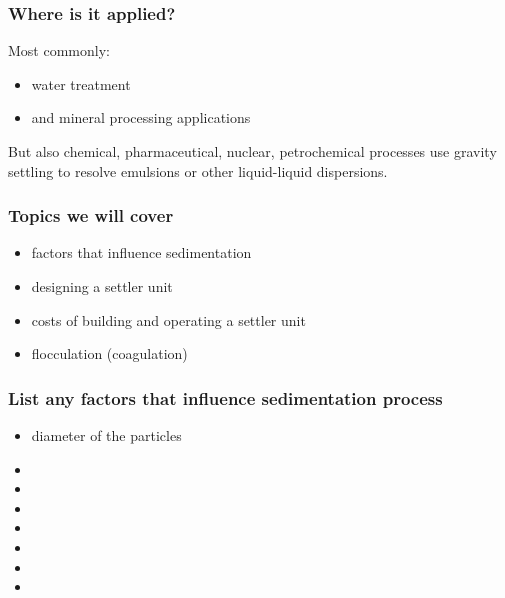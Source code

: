 \begin{frame}\frametitle{Where is it applied?}	
	Most commonly:
	\begin{itemize}
		\item	water treatment
		\item	and mineral processing applications
	\end{itemize}
	
	\vspace{12pt}
	But also chemical, pharmaceutical, nuclear, petrochemical processes use gravity settling to resolve emulsions or other liquid-liquid dispersions. 	
\end{frame}

\begin{frame}\frametitle{Topics we will cover}
	\begin{itemize}
		\item	factors that influence sedimentation
		\item	designing a settler unit
		\item	costs of building and operating a settler unit
		\item	flocculation (coagulation)
	\end{itemize}
\end{frame}

\begin{frame}\frametitle{List any factors that influence sedimentation process}
	\begin{itemize}
		\item	diameter of the particles
		\pause
		\item	\iftoggle{instructor}{strength of gravitational field}{}
		\item	\iftoggle{instructor}{relative density of particle vs fluid}{}
		\item	\iftoggle{instructor}{density of fluid}{}
		\item	\iftoggle{instructor}{viscosity of fluid}{}
		\item	\iftoggle{instructor}{particle concentration (hindered)}{}
		\item	\iftoggle{instructor}{{\color{myRed}{no effect}}: diameter of the vessel}{}
		\item	\iftoggle{instructor}{{\color{myRed}{no effect}}: mass of particle}{}
	\end{itemize}
\end{frame}

